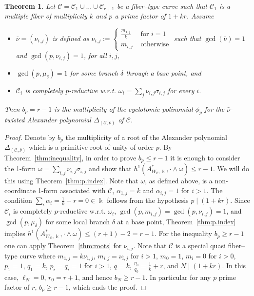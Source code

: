 \documentclass[11pt]{amsart}
\def\cC{\mathcal{C}}
\def\kk{\Bbbk}
\def\w{\omega}
\def\s{\sigma}
\theoremstyle{plain}
\newtheorem{theorem}[thm]{Theorem}
\theoremstyle{definition}
\begin{document}
\begin{theorem}
\label{thm:Milnor_nonreduced}
Let $\cC= \cC_1 \cup \ldots \cup \cC_{r+1}$ be a fiber--type curve such that $\cC_1$ is a multiple fiber of multiplicity $k$ and $p$ a prime factor of $1+kr$. Assume 
\begin{itemize}
    \item 
$\bar \nu=(\nu_{i,j})$ is defined as $\nu_{i,j}:=\begin{cases}\frac{m_{1,j}}{k} & \textrm{ for } i=1\\ m_{i,j} & \textrm{ otherwise}\end{cases}$ such that $\gcd(\bar \nu)=1$ and $\gcd(p,\nu_{i,j})=1$, for all $i, j$, 
    \item 
$\gcd(p,\mu_{\delta})=1$ for some branch $\delta$ through a base point, and 
    \item 
$\cC_i$ is completely $p$-reductive w.r.t. $\w_i=\sum_{j} \nu_{i,j}\s_{i,j}$ for every $i$.
\end{itemize}
Then $b_p=r-1$ is the multiplicity of the cyclotomic polinomial $\phi_p$ for the $\bar \nu$-twisted Alexander polynomial $\Delta_{(\cC,\bar \nu)}$
of $\cC$. %
\end{theorem}
\begin{proof}
Denote by $b_p$ the multiplicity of a root of the Alexander polynomial $\Delta_{(\cC,\bar \nu)}$ which is a primitive root of unity of order $p$. By Theorem~\ref{thm:inequality}, in order to prove $b_p\leq r-1$ it is enough to consider the 1-form $\w=\sum_{i,j} \nu_{i,j} \sigma_{i,j}$ and show that 
$h^1(A^*_{W_{\cC},\kk},\cdot\wedge\w)\leq r-1$. We will do this using Theorem~\ref{thm:p.index}. Note that $\w$, as defined above, is a non-coordinate 1-form associated with $\cC$, $\alpha_{1,j}=k$ and $\alpha_{i,j}=1$ for $i>1$. The condition $\sum_i\alpha_i=\frac{1}{k}+r=0\in\kk$ follows from the hypothesis $p\mid (1+kr)$. Since $\cC_i$ is completely $p$-reductive w.r.t. $\w_i$, $\gcd(p,m_{i,j})=\gcd(p,\nu_{i,j})=1$, and $\gcd(p,\mu_\delta)$ for some local branch $\delta$ at a base point, Theorem~\ref{thm:p.index} implies 
$h^1(A^*_{W_{\cC},\kk},\cdot\wedge\w)\leq (r+1)-2=r-1$.
For the inequality $b_p\geq r-1$ one can apply Theorem~\ref{thm:roots} for $\nu_{i,j}$. Note that $\cC$ is a special quasi fiber--type curve where $m_{1,j}=k\nu_{1,j}$, $m_{i,j}=\nu_{i,j}$ for $i>1$, $m_0=1$, $m_i=0$ for $i>0$, $p_1=1$, $q_1=k$, $p_i=q_i=1$ for $i>1$, $q=k$, $\frac{p_0}{q_0}=\frac{1}{k}+r$, and $N\mid (1+kr)$. In this case, $\ell_N=0$, $r_0=r+1$, and hence $b_N\geq r-1$. In particular for any $p$ prime factor of $r$, $b_p\geq r-1$, which ends the proof.
\end{proof}
\end{document}
